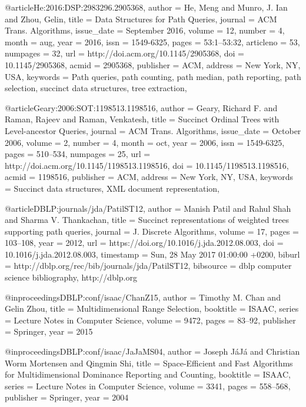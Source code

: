 @article{He:2016:DSP:2983296.2905368,
 author = {He, Meng and Munro, J. Ian and Zhou, Gelin},
 title = {Data Structures for Path Queries},
 journal = {ACM Trans. Algorithms},
 issue_date = {September 2016},
 volume = {12},
 number = {4},
 month = aug,
 year = {2016},
 issn = {1549-6325},
 pages = {53:1--53:32},
 articleno = {53},
 numpages = {32},
 url = {http://doi.acm.org/10.1145/2905368},
 doi = {10.1145/2905368},
 acmid = {2905368},
 publisher = {ACM},
 address = {New York, NY, USA},
 keywords = {Path queries, path counting, path median, path reporting, path selection, succinct data structures, tree extraction},
} 

@article{Geary:2006:SOT:1198513.1198516,
 author = {Geary, Richard F. and Raman, Rajeev and Raman, Venkatesh},
 title = {Succinct Ordinal Trees with Level-ancestor Queries},
 journal = {ACM Trans. Algorithms},
 issue_date = {October 2006},
 volume = {2},
 number = {4},
 month = oct,
 year = {2006},
 issn = {1549-6325},
 pages = {510--534},
 numpages = {25},
 url = {http://doi.acm.org/10.1145/1198513.1198516},
 doi = {10.1145/1198513.1198516},
 acmid = {1198516},
 publisher = {ACM},
 address = {New York, NY, USA},
 keywords = {Succinct data structures, XML document representation},
} 

@article{DBLP:journals/jda/PatilST12,
  author    = {Manish Patil and
               Rahul Shah and
               Sharma V. Thankachan},
  title     = {Succinct representations of weighted trees supporting path queries},
  journal   = {J. Discrete Algorithms},
  volume    = {17},
  pages     = {103--108},
  year      = {2012},
  url       = {https://doi.org/10.1016/j.jda.2012.08.003},
  doi       = {10.1016/j.jda.2012.08.003},
  timestamp = {Sun, 28 May 2017 01:00:00 +0200},
  biburl    = {http://dblp.org/rec/bib/journals/jda/PatilST12},
  bibsource = {dblp computer science bibliography, http://dblp.org}
}

@inproceedings{DBLP:conf/isaac/ChanZ15,
  author    = {Timothy M. Chan and
               Gelin Zhou},
  title     = {Multidimensional Range Selection},
  booktitle = {{ISAAC}},
  series    = {Lecture Notes in Computer Science},
  volume    = {9472},
  pages     = {83--92},
  publisher = {Springer},
  year      = {2015}
}

@inproceedings{DBLP:conf/isaac/JaJaMS04,
  author    = {Joseph J{\'{a}}J{\'{a}} and
               Christian Worm Mortensen and
               Qingmin Shi},
  title     = {Space-Efficient and Fast Algorithms for Multidimensional Dominance
               Reporting and Counting},
  booktitle = {{ISAAC}},
  series    = {Lecture Notes in Computer Science},
  volume    = {3341},
  pages     = {558--568},
  publisher = {Springer},
  year      = {2004}
}
